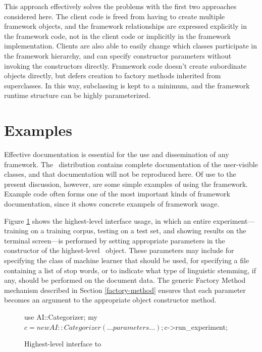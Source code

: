 This approach effectively solves the problems with the first two
approaches considered here.  The client code is freed from having to
create multiple framework objects, and the framework relationships are
expressed explicitly in the framework code, not in the client code or
implicitly in the framework implementation.  Clients are also able to
easily change which classes participate in the framework hierarchy,
and can specify constructor parameters without invoking the
constructors directly.  Framework code doesn't create subordinate
objects directly, but defers creation to factory methods inherited
from superclasses.  In this way, subclassing is kept to a minimum, and
the framework runtime structure can be highly parameterized.

\section{Examples}

Effective documentation is essential for the use and dissemination of
any framework. \cite[ch. 21]{fayad:99} The \aicat\ distribution
contains complete documentation of the user-visible classes, and that
documentation will not be reproduced here.  Of use to the present
discussion, however, are some simple examples of using the framework.
Example code often forms one of the most important kinds of framework
documentation, since it shows concrete exampels of framework
usage. \cite[p. 498]{fayad:99}

Figure \ref{high-level-interface} shows the highest-level
interface usage, in which an entire experiment---training on a
training corpus, testing on a test set, and showing results on the
terminal screen---is performed by setting appropriate parameters in
the constructor of the highest-level \aicat\ object.  These parameters
may include  for specifying the class of machine
learner that should be used,  for specifying a
file containing a list of stop words, or  to indicate
what type of linguistic stemming, if any, should be performed on the
document data.  The generic Factory Method mechanism described in
Section \ref{factory-method} ensures that each parameter becomes an
argument to the appropriate object constructor method.

\begin{figure}
\begin{code}
use AI::Categorizer;
my $c = new AI::Categorizer(...parameters...);
$c->run_experiment;
\end{code}
\caption{Highest-level interface to \aicat}
\label{high-level-interface}
\end{figure}

